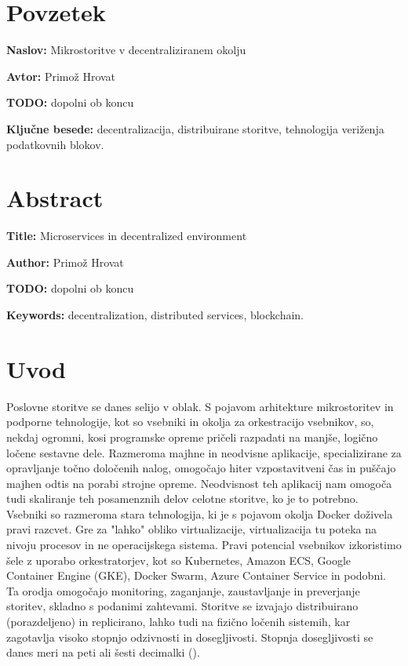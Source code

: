 \documentclass[a4paper, 12pt]{book}
\newcommand{\ttitle}{Mikrostoritve v decentraliziranem okolju}
\newcommand{\ttitleEn}{Microservices in decentralized environment}
\newcommand{\tauthor}{Primož Hrovat}
\newcommand{\tkeywords}{decentralizacija, distribuirane storitve, tehnologija veriženja podatkovnih blokov}
\newcommand{\tkeywordsEn}{decentralization, distributed services, blockchain}
\newcommand{\clearemptydoublepage}{\newpage{\pagestyle{empty}\cleardoublepage}}
\begin{document}
\chapter*{Povzetek}

\noindent\textbf{Naslov:} \ttitle
\bigskip

\noindent\textbf{Avtor:} \tauthor
\bigskip

\noindent

\textbf{TODO:} dopolni ob koncu

\bigskip

\noindent\textbf{Ključne besede:} \tkeywords.
\clearemptydoublepage

\chapter*{Abstract}

\noindent\textbf{Title:} \ttitleEn
\bigskip

\noindent\textbf{Author:} \tauthor
\bigskip

\noindent 
\textbf{TODO:} dopolni ob koncu

\bigskip

\noindent\textbf{Keywords:} \tkeywordsEn.
\clearemptydoublepage

\mainmatter
\setcounter{page}{1}
\pagestyle{fancy}

\chapter{Uvod}
Poslovne storitve se danes selijo v oblak.
S pojavom arhitekture mikrostoritev in podporne tehnologije, kot so vsebniki in okolja za orkestracijo vsebnikov, so, nekdaj ogromni, kosi programske opreme pričeli razpadati na manjše, logično ločene sestavne dele.
Razmeroma majhne in neodvisne aplikacije, specializirane za opravljanje točno določenih nalog, omogočajo hiter vzpostavitveni čas in puščajo majhen odtis na porabi strojne opreme.
Neodvisnost teh aplikacij nam omogoča tudi skaliranje teh posamenznih delov celotne storitve, ko je to potrebno.
Vsebniki so razmeroma stara tehnologija, ki je s pojavom okolja Docker doživela pravi razcvet.
Gre za "lahko" obliko virtualizacije, virtualizacija tu poteka na nivoju procesov in ne operacijskega sistema.
Pravi potencial vsebnikov izkoristimo šele z uporabo orkestratorjev, kot so Kubernetes, Amazon ECS, Google Container Engine (GKE), Docker Swarm, Azure Container Service in podobni.
Ta orodja omogočajo monitoring, zaganjanje, zaustavljanje in preverjanje storitev, skladno s podanimi zahtevami.
Storitve se izvajajo distribuirano (porazdeljeno) in replicirano, lahko tudi na fizično ločenih sistemih, kar zagotavlja visoko stopnjo odzivnosti in dosegljivosti. Stopnja dosegljivosti se danes meri na peti ali šesti decimalki ().
\end{document}

